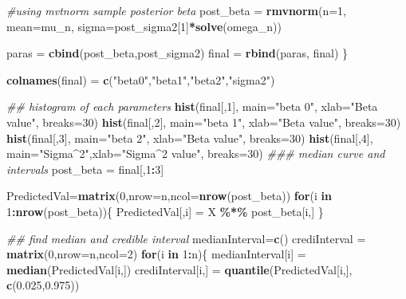\documentclass[]{article}
\newenvironment{Shaded}{\begin{snugshade}}{\end{snugshade}}
\newcommand{\CommentTok}[1]{\textcolor[rgb]{0.56,0.35,0.01}{\textit{#1}}}
\newcommand{\ControlFlowTok}[1]{\textcolor[rgb]{0.13,0.29,0.53}{\textbf{#1}}}
\newcommand{\DataTypeTok}[1]{\textcolor[rgb]{0.13,0.29,0.53}{#1}}
\newcommand{\DecValTok}[1]{\textcolor[rgb]{0.00,0.00,0.81}{#1}}
\newcommand{\FloatTok}[1]{\textcolor[rgb]{0.00,0.00,0.81}{#1}}
\newcommand{\KeywordTok}[1]{\textcolor[rgb]{0.13,0.29,0.53}{\textbf{#1}}}
\newcommand{\NormalTok}[1]{#1}
\newcommand{\OperatorTok}[1]{\textcolor[rgb]{0.81,0.36,0.00}{\textbf{#1}}}
\newcommand{\StringTok}[1]{\textcolor[rgb]{0.31,0.60,0.02}{#1}}
\begin{document}
\begin{Shaded}
\begin{Highlighting}[]
  \CommentTok{\#using mvtnorm sample posterior beta}
\NormalTok{  post\_beta =}\StringTok{ }\KeywordTok{rmvnorm}\NormalTok{(}\DataTypeTok{n=}\DecValTok{1}\NormalTok{, }\DataTypeTok{mean=}\NormalTok{mu\_n, }\DataTypeTok{sigma=}\NormalTok{post\_sigma2[}\DecValTok{1}\NormalTok{]}\OperatorTok{*}\KeywordTok{solve}\NormalTok{(omega\_n))}
  
\NormalTok{  paras =}\StringTok{ }\KeywordTok{cbind}\NormalTok{(post\_beta,post\_sigma2)}
\NormalTok{  final =}\StringTok{ }\KeywordTok{rbind}\NormalTok{(paras, final)}
\NormalTok{\}}

\KeywordTok{colnames}\NormalTok{(final) =}\StringTok{ }\KeywordTok{c}\NormalTok{(}\StringTok{"beta0"}\NormalTok{,}\StringTok{"beta1"}\NormalTok{,}\StringTok{"beta2"}\NormalTok{,}\StringTok{"sigma2"}\NormalTok{)}

\CommentTok{\#\# histogram of each parameters}
\KeywordTok{hist}\NormalTok{(final[,}\DecValTok{1}\NormalTok{], }\DataTypeTok{main=}\StringTok{"beta 0"}\NormalTok{, }\DataTypeTok{xlab=}\StringTok{"Beta value"}\NormalTok{, }\DataTypeTok{breaks=}\DecValTok{30}\NormalTok{)}
\KeywordTok{hist}\NormalTok{(final[,}\DecValTok{2}\NormalTok{], }\DataTypeTok{main=}\StringTok{"beta 1"}\NormalTok{, }\DataTypeTok{xlab=}\StringTok{"Beta value"}\NormalTok{, }\DataTypeTok{breaks=}\DecValTok{30}\NormalTok{)}
\KeywordTok{hist}\NormalTok{(final[,}\DecValTok{3}\NormalTok{], }\DataTypeTok{main=}\StringTok{"beta 2"}\NormalTok{, }\DataTypeTok{xlab=}\StringTok{"Beta value"}\NormalTok{, }\DataTypeTok{breaks=}\DecValTok{30}\NormalTok{)}
\KeywordTok{hist}\NormalTok{(final[,}\DecValTok{4}\NormalTok{], }\DataTypeTok{main=}\StringTok{"Sigma\^{}2"}\NormalTok{,}\DataTypeTok{xlab=}\StringTok{"Sigma\^{}2 value"}\NormalTok{, }\DataTypeTok{breaks=}\DecValTok{30}\NormalTok{)}
\CommentTok{\#\#\# median curve and intervals}
\NormalTok{post\_beta =}\StringTok{ }\NormalTok{final[,}\DecValTok{1}\OperatorTok{:}\DecValTok{3}\NormalTok{]}

\NormalTok{PredictedVal=}\KeywordTok{matrix}\NormalTok{(}\DecValTok{0}\NormalTok{,}\DataTypeTok{nrow=}\NormalTok{n,}\DataTypeTok{ncol=}\KeywordTok{nrow}\NormalTok{(post\_beta))}
\ControlFlowTok{for}\NormalTok{(i }\ControlFlowTok{in} \DecValTok{1}\OperatorTok{:}\KeywordTok{nrow}\NormalTok{(post\_beta))\{}
\NormalTok{  PredictedVal[,i] =}\StringTok{ }\NormalTok{X }\OperatorTok{\%*\%}\StringTok{ }\NormalTok{post\_beta[i,]}
\NormalTok{\}}

\CommentTok{\#\# find median and credible interval}
\NormalTok{medianInterval=}\KeywordTok{c}\NormalTok{()}
\NormalTok{crediInterval =}\StringTok{ }\KeywordTok{matrix}\NormalTok{(}\DecValTok{0}\NormalTok{,}\DataTypeTok{nrow=}\NormalTok{n,}\DataTypeTok{ncol=}\DecValTok{2}\NormalTok{)}
\ControlFlowTok{for}\NormalTok{(i }\ControlFlowTok{in} \DecValTok{1}\OperatorTok{:}\NormalTok{n)\{}
\NormalTok{  medianInterval[i] =}\StringTok{ }\KeywordTok{median}\NormalTok{(PredictedVal[i,])}
\NormalTok{  crediInterval[i,] =}\StringTok{ }\KeywordTok{quantile}\NormalTok{(PredictedVal[i,], }\KeywordTok{c}\NormalTok{(}\FloatTok{0.025}\NormalTok{,}\FloatTok{0.975}\NormalTok{))}


\end{Highlighting}
\end{Shaded}
\end{document}
